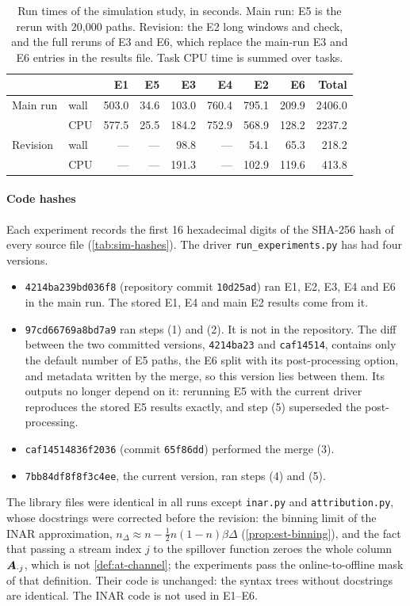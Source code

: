 \begin{table}[t]
\centering
\caption{Run times of the simulation study, in seconds. Main run: E5 is the rerun with
20{,}000 paths. Revision: the E2 long windows and check, and the full reruns of E3 and E6,
which replace the main-run E3 and E6 entries in the results file. Task CPU time is summed
over tasks.}
\label{tab:sim-runtime}
\small
\begin{tabular}{@{}llrrrrrrr@{}}
\toprule
 & & E1 & E5 & E3 & E4 & E2 & E6 & Total\\
\midrule
Main run & wall & 503.0 & 34.6 & 103.0 & 760.4 & 795.1 & 209.9 & 2406.0\\
 & CPU & 577.5 & 25.5 & 184.2 & 752.9 & 568.9 & 128.2 & 2237.2\\
\addlinespace
Revision & wall & --- & --- & 98.8 & --- & 54.1 & 65.3 & 218.2\\
 & CPU & --- & --- & 191.3 & --- & 102.9 & 119.6 & 413.8\\
\bottomrule
\end{tabular}
\end{table}

\paragraph{Code hashes} Each experiment records the first 16 hexadecimal digits of the
SHA-256 hash of every source file (\cref{tab:sim-hashes}). The driver
\texttt{run\_experiments.py} has had four versions.
\begin{itemize}
  \item \texttt{4214ba239bd036f8} (repository commit \texttt{10d25ad}) ran E1, E2, E3, E4
  and E6 in the main run. The stored E1, E4 and main E2 results come from it.
  \item \texttt{97cd66769a8bd7a9} ran steps (1) and (2). It is not in the repository. The
  diff between the two committed versions, \texttt{4214ba23} and \texttt{caf14514}, contains
  only the default number of E5 paths, the E6 split with its post-processing option, and
  metadata written by the merge, so this version lies between them. Its outputs no longer
  depend on it: rerunning E5 with the current driver reproduces the stored E5 results
  exactly, and step (5) superseded the post-processing.
  \item \texttt{caf14514836f2036} (commit \texttt{65f86dd}) performed the merge (3).
  \item \texttt{7bb84df8f8f3c4ee}, the current version, ran steps (4) and (5).
\end{itemize}
The library files were identical in all runs except \texttt{inar.py} and
\texttt{attribution.py}, whose docstrings were corrected before the revision: the binning
limit of the INAR approximation, $n_\Delta\approx n-\tfrac12n(1-n)\beta\Delta$
(\cref{prop:est-binning}), and the fact that passing a stream index $j$ to the spillover
function zeroes the whole column $\bm{A}_{\cdot j}$, which is not \cref{def:at-channel}; the
experiments pass the online-to-offline mask of that definition. Their code is unchanged:
the syntax trees without docstrings are identical. The INAR code is not used in E1--E6.

